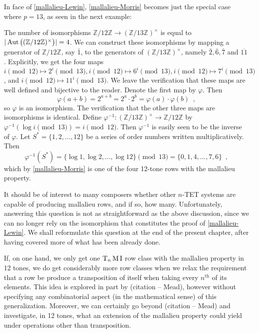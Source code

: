 In face of \ref{mallalieu-Lewin}, \ref{mallalieu-Morris} becomes just the special case where $p = 13$, as seen in the next example:

\begin{example} The number of isomorphisms $\mathbb{Z} / 12 \mathbb{Z} \to (\mathbb{Z} / 13 \mathbb{Z})^\times$ is equal to $|\operatorname{Aut}\big((\mathbb{Z} / 12 \mathbb{Z})^\times\big)| = 4$. We can construct these isomorphisms by mapping a generator of $\mathbb{Z} / 12 \mathbb{Z}$, say $\bar{1}$, to the generators of $(\mathbb{Z} / 13 \mathbb{Z})^\times$, namely $\bar{2}, \bar{6}, \bar{7}$ and $\overline{11}$. Explicitly, we get the four maps $i \pmod{12} \mapsto 2^i \pmod{13}, i \pmod{12} \mapsto 6^i \pmod{13}, i \pmod{12} \mapsto 7^i \pmod{13}$, and $i \pmod{12} \mapsto 11^i \pmod{13}$. We leave the verification that these maps are well defined and bijective to the reader. Denote the first map by $\varphi$. Then
$$
\varphi(a + b) = 2^{a + b} = 2^a \cdot 2^b = \varphi(a) \cdot \varphi(b) \enspace,
$$
so $\varphi$ is an isomorphism. The verification that the other three maps are isomorphisms is identical. Define $\varphi^{-1} : (\mathbb{Z} / 13 \mathbb{Z})^\times \to \mathbb{Z} / 12 \mathbb{Z}$ by $\varphi^{-1}(\log i \pmod{13}) = i \pmod{12}$. Then $\varphi^{-1}$ is easily seen to be the inverse of $\varphi$. Let $S^* = \{ 1, 2, \dots, 12 \}$ be a series of order numbers written multiplicatively. Then
$$
\varphi^{-1}(S^*) = \{ \log 1, \log 2, \dots, \log 12 \} \pmod{13} = \{ 0, 1, 4, \dots, 7, 6 \} \enspace,
$$
which by \ref{mallalieu-Morris} is one of the four 12-tone rows with the mallalieu property.
\end{example}

It should be of interest to many composers whether other $n$-TET systems are capable of producing mallalieu rows, and if so, how many. Unfortunately, answering this question is not as straightforward as the above discussion, since we can no longer rely on the isomorphism that constitutes the proof of \ref{mallalieu-Lewin}. We shall reformulate this question at the end of the present chapter, after having covered more of what has been already done.

If, on one hand, we only get one $\operatorname{T}_n\operatorname{M}\operatorname{I}$ row class with the mallalieu property in 12 tones, we do get considerably more row classes when we relax the requirement that a row be produce a transposition of itself when taking every $n^\text{th}$ of its elements. This idea is explored in part by (citation -- Mead), however without specifying any combinatorial aspect (in the mathematical sense) of this generalization. Moreover, we can certainly go beyond (citation -- Mead) and investigate, in 12 tones, what an extension of the mallalieu property could yield under operations other than transposition.

